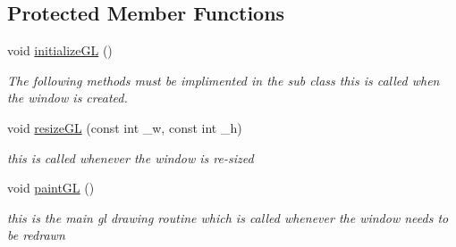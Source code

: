 \subsection*{Protected Member Functions}
\begin{DoxyCompactItemize}
\item 
void \hyperlink{classGLWindow_a39e39761cd7323806917a217cc7caea5}{initializeGL} ()
\begin{DoxyCompactList}\small\item\em The following methods must be implimented in the sub class this is called when the window is created. \item\end{DoxyCompactList}\item 
void \hyperlink{classGLWindow_abe57c0f40e59cba4c98759121e22eb47}{resizeGL} (const int \_\-w, const int \_\-h)
\begin{DoxyCompactList}\small\item\em this is called whenever the window is re-\/sized \item\end{DoxyCompactList}\item 
void \hyperlink{classGLWindow_a9bd2503dd5f812c10a9481f22ecd3403}{paintGL} ()
\begin{DoxyCompactList}\small\item\em this is the main gl drawing routine which is called whenever the window needs to be redrawn \item\end{DoxyCompactList}\end{DoxyCompactItemize}
